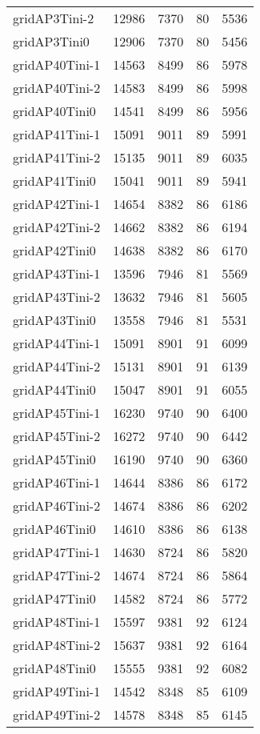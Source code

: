 \documentclass[../../../thesis.tex]{subfiles}
\begin{document}
\begin{longtable}{lrrrr}
gridAP3Tini-2 & 12986 & 7370 & 80 & 5536 \\
gridAP3Tini0 & 12906 & 7370 & 80 & 5456 \\
gridAP40Tini-1 & 14563 & 8499 & 86 & 5978 \\
gridAP40Tini-2 & 14583 & 8499 & 86 & 5998 \\
gridAP40Tini0 & 14541 & 8499 & 86 & 5956 \\
gridAP41Tini-1 & 15091 & 9011 & 89 & 5991 \\
gridAP41Tini-2 & 15135 & 9011 & 89 & 6035 \\
gridAP41Tini0 & 15041 & 9011 & 89 & 5941 \\
gridAP42Tini-1 & 14654 & 8382 & 86 & 6186 \\
gridAP42Tini-2 & 14662 & 8382 & 86 & 6194 \\
gridAP42Tini0 & 14638 & 8382 & 86 & 6170 \\
gridAP43Tini-1 & 13596 & 7946 & 81 & 5569 \\
gridAP43Tini-2 & 13632 & 7946 & 81 & 5605 \\
gridAP43Tini0 & 13558 & 7946 & 81 & 5531 \\
gridAP44Tini-1 & 15091 & 8901 & 91 & 6099 \\
gridAP44Tini-2 & 15131 & 8901 & 91 & 6139 \\
gridAP44Tini0 & 15047 & 8901 & 91 & 6055 \\
gridAP45Tini-1 & 16230 & 9740 & 90 & 6400 \\
gridAP45Tini-2 & 16272 & 9740 & 90 & 6442 \\
gridAP45Tini0 & 16190 & 9740 & 90 & 6360 \\
gridAP46Tini-1 & 14644 & 8386 & 86 & 6172 \\
gridAP46Tini-2 & 14674 & 8386 & 86 & 6202 \\
gridAP46Tini0 & 14610 & 8386 & 86 & 6138 \\
gridAP47Tini-1 & 14630 & 8724 & 86 & 5820 \\
gridAP47Tini-2 & 14674 & 8724 & 86 & 5864 \\
gridAP47Tini0 & 14582 & 8724 & 86 & 5772 \\
gridAP48Tini-1 & 15597 & 9381 & 92 & 6124 \\
gridAP48Tini-2 & 15637 & 9381 & 92 & 6164 \\
gridAP48Tini0 & 15555 & 9381 & 92 & 6082 \\
gridAP49Tini-1 & 14542 & 8348 & 85 & 6109 \\
gridAP49Tini-2 & 14578 & 8348 & 85 & 6145 \\

\end{longtable}
\end{document}

